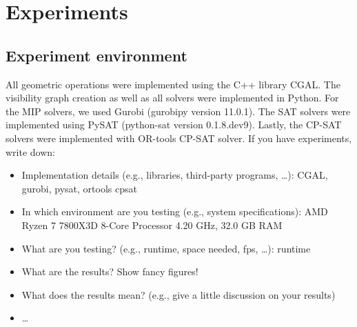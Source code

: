 \chapter{Experiments}
\section{Experiment environment}
All geometric operations were implemented using the C++ library CGAL. The visibility graph creation as well as all solvers were implemented in Python. For the MIP solvers, we used Gurobi (gurobipy version 11.0.1). The SAT solvers were implemented using PySAT (python-sat version 0.1.8.dev9). Lastly, the CP-SAT solvers were implemented with OR-tools CP-SAT solver.
If you have experiments, write down:
\begin{itemize}
	\item Implementation details (e.g., libraries, third-party programs, \dots): CGAL, gurobi, pysat, ortools cpsat
	\item In which environment are you testing (e.g., system specifications): AMD Ryzen 7 7800X3D 8-Core Processor 4.20 GHz, 32.0 GB RAM
	\item What are you testing? (e.g., runtime, space needed, fps, \dots): runtime
	\item What are the results? Show fancy figures!
	\item What does the results mean? (e.g., give a little discussion on your results)
	\item \dots
\end{itemize}